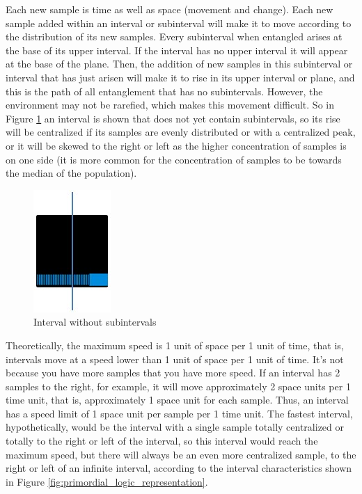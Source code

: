 Each new sample is time as well as space (movement and change). Each new sample added within an interval or subinterval will make it to move according to the distribution of its new samples. Every subinterval when entangled arises at the base of its upper interval. If the interval has no upper interval it will appear at the base of the plane. Then, the addition of new samples in this subinterval or interval that has just arisen will make it to rise in its upper interval or plane, and this is the path of all entanglement that has no subintervals. However, the environment may not be rarefied, which makes this movement difficult. So in Figure \ref{fig:consciousness_space_plan_nosubinterval} an interval is shown that does not yet contain subintervals, so its rise will be centralized if its samples are evenly distributed or with a centralized peak, or it will be skewed to the right or left as the higher concentration of samples is on one side (it is more common for the concentration of samples to be towards the median of the population).
	\begin{figure}[H]
	\caption{ Interval without subintervals}
	\label{fig:consciousness_space_plan_nosubinterval}
	\centering
	\includegraphics[scale=.7]{sections/images/consciousness_space_plan_nosubinterval.jpg}
	\end{figure}

Theoretically, the maximum speed is 1 unit of space per 1 unit of time, that is, intervals move at a speed lower than 1 unit of space per 1 unit of time. It's not because you have more samples that you have more speed. If an interval has 2 samples to the right, for example, it will move approximately 2 space units per 1 time unit, that is, approximately 1 space unit for each sample. Thus, an interval has a speed limit of 1 space unit per sample per 1 time unit. The fastest interval, hypothetically, would be the interval with a single sample totally centralized or totally to the right or left of the interval, so this interval would reach the maximum speed, but there will always be an even more centralized sample, to the right or left of an infinite interval, according to the interval characteristics shown in Figure \ref{fig:primordial_logic_representation}.

